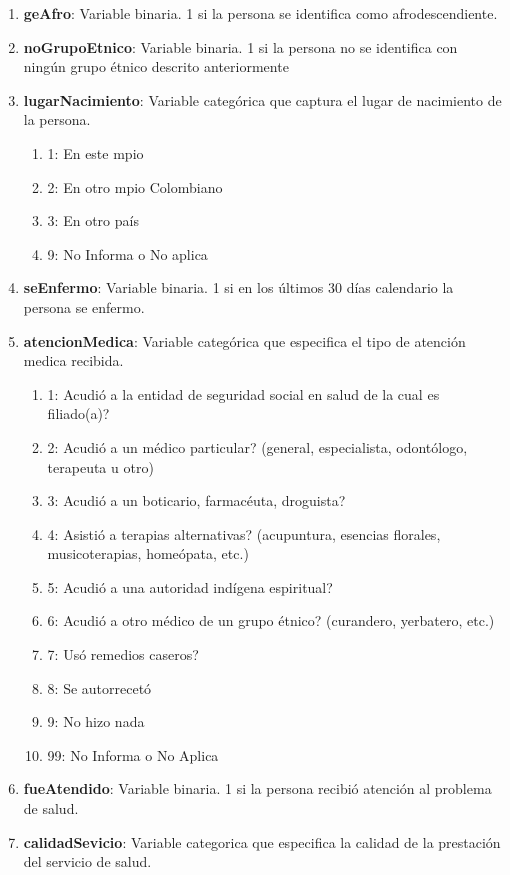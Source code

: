 \documentclass[12pt,a4paper]{article}
\begin{document}
\begin{enumerate}
	\item \textbf{geAfro}: Variable binaria. 1 si la persona se identifica como afrodescendiente.
	\item \textbf{noGrupoEtnico}: Variable binaria. 1 si la persona no se identifica con ningún grupo étnico descrito anteriormente
	\item \textbf{lugarNacimiento}: Variable categórica que captura el lugar de nacimiento de la persona.
		\begin{enumerate}
			\item 1: En este mpio
			\item 2: En otro mpio Colombiano
			\item 3: En otro país
			\item 9: No Informa o No aplica
		\end{enumerate}
	\item \textbf{seEnfermo}: Variable binaria. 1 si en los últimos 30 días calendario la persona se enfermo. 
	\item \textbf{atencionMedica}: Variable categórica que especifica el tipo de atención medica recibida.
		\begin{enumerate}
			\item 1: Acudió a la entidad de seguridad social en salud de la cual es filiado(a)?
			\item 2: Acudió a un médico particular? (general, especialista, odontólogo, terapeuta u otro)
			\item 3: Acudió a un boticario, farmacéuta, droguista?
			\item 4: Asistió a terapias alternativas? (acupuntura, esencias florales, musicoterapias, homeópata, etc.)
			\item 5: Acudió a una autoridad indígena espiritual?
			\item 6: Acudió a otro médico de un grupo étnico? (curandero, yerbatero, etc.)
			\item 7: Usó remedios caseros?
			\item 8: Se autorrecetó
			\item 9: No hizo nada
			\item 99: No Informa o No Aplica
		\end{enumerate}
	\item \textbf{fueAtendido}: Variable binaria. 1 si la persona recibió atención al problema de salud.
	\item \textbf{calidadSevicio}: Variable categorica que especifica la calidad de la prestación del servicio de salud.
		\begin{enumerate}

\end{enumerate}
\end{enumerate}
\end{document}
